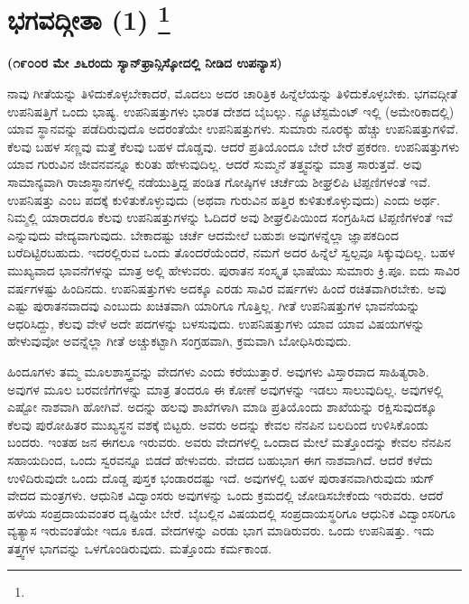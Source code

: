
\chapter[ಭಾಗವದ್ಗೀತಾ (೧) ]{ಭಗವದ್ಗೀತಾ (1) \protect\footnote{}}

\centerline{\textbf{(೧೯೦೦ರ ಮೇ ೨೬ರಂದು ಸ್ಯಾನ್​ಫ್ರಾನ್ಸಿಸ್ಕೋದಲ್ಲಿ ನೀಡಿದ ಉಪನ್ಯಾಸ)}}

ನಾವು ಗೀತೆಯನ್ನು ತಿಳಿದುಕೊಳ್ಳಬೇಕಾದರೆ, ಮೊದಲು ಅದರ ಚಾರಿತ್ರಿಕ ಹಿನ್ನೆಲೆಯನ್ನು ತಿಳಿದುಕೊಳ್ಳಬೇಕು. ಭಗವದ್ಗೀತೆ ಉಪನಿಷತ್ತಿಗೆ ಒಂದು ಭಾಷ್ಯ. ಉಪನಿಷತ್ತುಗಳು ಭಾರತ ದೇಶದ ಬೈಬಲ್ಲು. ನ್ಯೂಟೆಸ್ಟಮೆಂಟ್​ ಇಲ್ಲಿ (ಅಮೇರಿಕಾದಲ್ಲಿ) ಯಾವ ಸ್ಥಾನವನ್ನು ಪಡೆದಿರುವುದೊ ಅದರಂತೆಯೇ ಉಪನಿಷತ್ತುಗಳು. ಸುಮಾರು ನೂರಕ್ಕು ಹೆಚ್ಚು ಉಪನಿಷತ್ತುಗಳಿವೆ. ಕೆಲವು ಬಹಳ ಸಣ್ಣವು ಮತ್ತೆ ಕೆಲವು ಬಹಳ ದೊಡ್ಡವು. ಆದರೆ ಪ್ರತಿಯೊಂದೂ ಬೇರೆ ಬೇರೆ ಪ್ರಕರಣ. ಉಪನಿಷತ್ತುಗಳು ಯಾವ ಗುರುವಿನ ಜೀವನವನ್ನೂ ಕುರಿತು ಹೇಳುವುದಿಲ್ಲ. ಆದರೆ ಸುಮ್ಮನೆ ತತ್ತ್ವವನ್ನು ಮಾತ್ರ ಸಾರುತ್ತವೆ. ಅವು ಸಾಮಾನ್ಯವಾಗಿ ರಾಜಾಸ್ಥಾನಗಳಲ್ಲಿ ನಡೆಯುತ್ತಿದ್ದ ಪಂಡಿತ ಗೋಷ್ಠಿಗಳ ಚರ್ಚೆಯ ಶೀಘ್ರಲಿಪಿ ಟಿಪ್ಪಣಿಗಳಂತೆ ಇವೆ. ಉಪನಿಷತ್ತು ಎಂಬ ಪದಕ್ಕೆ ಕುಳಿತುಕೊಳ್ಳುವುದು (ಅಥವಾ ಗುರುವಿನ ಹತ್ತಿರ ಕುಳಿತುಕೊಳ್ಳುವುದು) ಎಂದು ಅರ್ಥ. ನಿಮ್ಮಲ್ಲಿ ಯಾರಾದರೂ ಕೆಲವು ಉಪನಿಷತ್ತುಗಳನ್ನು ಓದಿದರೆ ಅವು ಶೀಘ್ರಲಿಪಿಯಿಂದ ಸಂಗ್ರಹಿಸಿದ ಟಿಪ್ಪಣಿಗಳಂತೆ ಇವೆ ಎನ್ನುವುದು ವೇದ್ಯ\-ವಾಗುವುದು. ಬೇಕಾದಷ್ಟು ಚರ್ಚೆ ಆದಮೇಲೆ ಬಹುಶಃ ಅವುಗಳನ್ನೆಲ್ಲಾ ಜ್ಞಾಪಕದಿಂದ ಬರೆದಿಟ್ಟಿರಬಹುದು. ಇದರಲ್ಲಿರುವ ಒಂದು ತೊಂದರೆಯೆಂದರೆ, ನಮಗೆ ಅದರ ಹಿನ್ನೆಲೆ ಸ್ವಲ್ಪವೂ ಸಿಕ್ಕುವುದಿಲ್ಲ. ಬಹಳ ಮುಖ್ಯವಾದ ಭಾವನೆಗಳನ್ನು ಮಾತ್ರ ಅಲ್ಲಿ ಹೇಳುವರು. ಪುರಾತನ ಸಂಸ್ಕೃತ ಭಾಷೆಯು ಸುಮಾರು ಕ್ರಿ.ಪೂ. ಐದು ಸಾವಿರ ವರ್ಷಗಳಷ್ಟು ಹಿಂದಿನದು. ಉಪನಿಷತ್ತುಗಳು ಅದಕ್ಕೂ ಎರಡು ಸಾವಿರ ವರ್ಷಗಳು ಹಿಂದೆ ರಚಿತವಾಗಿರಬೇಕು. ಅವು ಎಷ್ಟು ಪುರಾತನವಾದವು ಎಂಬುದು ಖಚಿತವಾಗಿ ಯಾರಿಗೂ ಗೊತ್ತಿಲ್ಲ. ಗೀತೆ ಉಪನಿಷತ್ತುಗಳ ಭಾವನೆಯನ್ನು ಆಧರಿಸಿದ್ದು, ಕೆಲವು ವೇಳೆ ಅದೇ ಪದಗಳನ್ನು ಬಳಸುವುದು. ಉಪನಿಷತ್ತುಗಳು ಯಾವ ಯಾವ ವಿಷಯಗಳನ್ನು ಹೇಳುವುವೋ ಅವನ್ನೆಲ್ಲಾ ಗೀತೆ ಅಚ್ಚುಕಟ್ಟಾಗಿ ಸಂಗ್ರಹವಾಗಿ, ಕ್ರಮವಾಗಿ ಬೋಧಿಸಿರುವುದು.

ಹಿಂದೂಗಳು ತಮ್ಮ ಮೂಲಶಾಸ್ತ್ರವನ್ನು ವೇದಗಳು ಎಂದು ಕರೆಯುತ್ತಾರೆ. ಅವುಗಳು ವಿಸ್ತಾರವಾದ ಸಾಹಿತ್ಯರಾಶಿ. ಅವುಗಳ ಮೂಲ ಬರವಣಿಗೆಗಳನ್ನು ಮಾತ್ರ ತಂದರೂ ಈ ಕೋಣೆ ಅವುಗಳನ್ನು ಇಡಲು ಸಾಲುವುದಿಲ್ಲ. ಅವುಗಳಲ್ಲಿ ಎಷ್ಟೋ ನಾಶವಾಗಿ ಹೋಗಿವೆ. ಅದನ್ನು ಹಲವು ಶಾಖೆಗಳಾಗಿ ಮಾಡಿ ಪ್ರತಿಯೊಂದು ಶಾಖೆಯನ್ನು ರಕ್ಷಿಸುವುದಕ್ಕೂ ಕೆಲವು ಪುರೋಹಿತರ ಮುಖ್ಯಸ್ಥನ ವಶಕ್ಕೆ ಬಿಟ್ಟರು. ಅವರು ಅದನ್ನು ಕೇವಲ ನೆನಪಿನ ಬಲದಿಂದ ಉಳಿಸಿಕೊಂಡು ಬಂದರು. ಇಂತಹ ಜನ ಈಗಲೂ ಇರುವರು. ಅವರು ವೇದಗಳಲ್ಲಿ ಒಂದಾದ ಮೇಲೆ ಮತ್ತೊಂದನ್ನು ಕೇವಲ ನೆನಪಿನ ಸಹಾಯದಿಂದ, ಒಂದು ಸ್ವರವನ್ನೂ ಬಿಡದೆ ಹೇಳುವರು. ವೇದದ ಬಹುಭಾಗ ಈಗ ನಾಶವಾಗಿದೆ. ಆದರೆ ಕಳೆದು ಉಳಿದಿರುವುದೇ ಒಂದು ದೊಡ್ಡ ಪುಸ್ತಕ ಭಂಡಾರದಷ್ಟು ಇದೆ. ಅವುಗಳಲ್ಲಿ ಬಹಳ ಪುರಾತನವಾಗಿರುವುದು ಋಗ್​ ವೇದದ ಮಂತ್ರಗಳು. ಆಧುನಿಕ ವಿದ್ವಾಂಸರು ಅವುಗಳನ್ನು ಒಂದು ಕ್ರಮದಲ್ಲಿ ಜೋಡಿಸಬೇಕೆಂದು ಇರುವರು. ಆದರೆ ಹಳೆಯ ಸಂಪ್ರದಾಯವಂತರ ದೃಷ್ಟಿಯೇ ಬೇರೆ. ಬೈಬಲ್ಲಿನ ವಿಷಯದಲ್ಲಿ ಸಂಪ್ರದಾಯಸ್ಥರಿಗೂ ಆಧುನಿಕ ವಿದ್ವಾಂಸರಿಗೂ ವ್ಯತ್ಯಾಸ ಇರುವಂತೆಯೇ ಇದೂ ಕೂಡ. ವೇದಗಳನ್ನು ಎರಡು ಭಾಗ ಮಾಡಿರುವರು. ಒಂದು ಉಪನಿಷತ್ತು. ಇದು ತತ್ತ್ವಗಳ ಭಾಗವನ್ನು ಒಳಗೊಂಡಿರುವುದು. ಮತ್ತೊಂದು ಕರ್ಮಕಾಂಡ.

